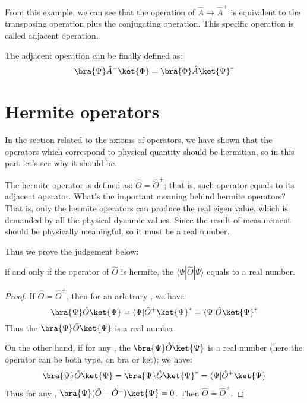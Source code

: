From this example, we can see that the operation of $\hat{A}
\rightarrow \hat{A}^{+}$ is equivalent to the transposing operation
plus the conjugating operation. This specific operation is called
adjacent operation.

The adjacent operation can be finally defined as:
\begin{equation}\label{}
\bra{\Psi}\hat{A}^{+}\ket{\Phi} = \bra{\Phi}\hat{A}\ket{\Psi}^{*}
\end{equation}

\section{Hermite operators}
%
%
%
In the section related to the axioms of operators, we have shown that
the operators which correspond to physical quantity should be
hermitian, so in this part let's see why it should be.

The hermite operator is defined as: $\hat{O} = \hat{O}^{+}$; that
is, such operator equals to its adjacent operator. What's the
important meaning behind hermite operators? That is, only the
hermite operators can produce the real eigen value, which is
demanded by all the physical dynamic values. Since the result of
measurement should be physically meaningful, so it must be a real
number.

Thus we prove the judgement below:
\begin{theorem}
if and only if the operator of $\hat{O}$ is hermite, the
$\langle\Psi|\hat{O}|\Psi\rangle$ equals to a real number.
\end{theorem}

\begin{proof}
If $\hat{O} = \hat{O}^{+}$, then for an arbitrary \kett{\Psi}, we
have:
\begin{equation}\label{}
\bra{\Psi}\hat{O}\ket{\Psi} = \langle\Psi|\hat{O}^{+}\ket{\Psi}^{*}
= \langle\Psi|\hat{O}\ket{\Psi}^{*}
\end{equation}
Thus the $\bra{\Psi}\hat{O}\ket{\Psi}$ is a real number.

On the other hand, if for any \kett{\Psi}, the
$\bra{\Psi}\hat{O}\ket{\Psi}$ is a real number (here the operator
can be both type, on bra or ket); we have:
\begin{equation}\label{}
\bra{\Psi}\hat{O}\ket{\Psi} =\bra{\Psi}\hat{O}\ket{\Psi}^{*} =
\langle\Psi|\hat{O}^{+}\ket{\Psi}
\end{equation}
Thus for any \kett{\Psi}, $\bra{\Psi}(\hat{O}-\hat{O}^{+})\ket{\Psi}
= 0$. Then $\hat{O} = \hat{O}^{+}$. \qedhere
\end{proof}

